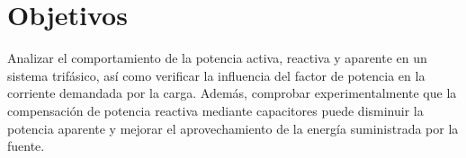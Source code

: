 \section{Objetivos}

	Analizar el comportamiento de la potencia activa, reactiva y aparente en un sistema trifásico, así como verificar la influencia del factor de potencia en la corriente demandada por la carga. Además, comprobar experimentalmente que la compensación de potencia reactiva mediante capacitores puede disminuir la potencia aparente y mejorar el aprovechamiento de la energía suministrada por la fuente.
	